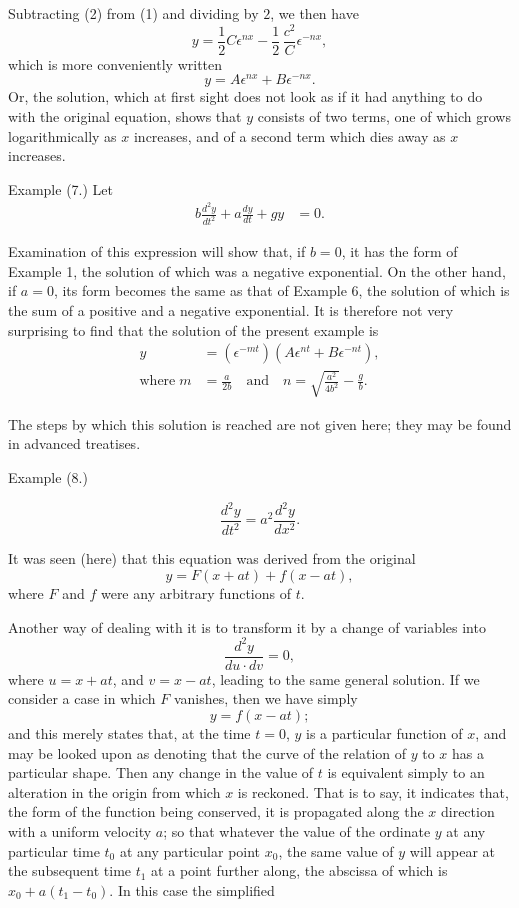 \documentclass{ximera}
\begin{document}
Subtracting (2) from (1) and dividing by $2$, we
then have
\[
y = \frac{1}{2} C \epsilon^{nx} - \frac{1}{2}\, \frac{c^2}{C} \epsilon^{-nx},
\]
which is more conveniently written
\[
y = A \epsilon^{nx} + B \epsilon^{-nx}.
\]
Or, the solution, which at first sight does not look
as if it had anything to do with the original equation,
shows that $y$ consists of two terms, one of which
grows logarithmically as $x$ increases, and of a second
term which dies away as $x$ increases.


Example (7.)
   Let
\begin{align*}
b \frac{d^2y}{dt^2} + a \frac{dy}{dt} + gy &= 0.
\end{align*}

Examination of this expression will show that, if
$b = 0$, it has the form of Example 1, the solution of
which was a negative exponential. On the other
hand, if $a = 0$, its form becomes the same as that of
Example 6, the solution of which is the sum of a
positive and a negative exponential. It is therefore
not very surprising to find that the solution of the
present example is
\begin{align*}
y &= (\epsilon^{-mt})(A \epsilon^{nt} + B \epsilon^{-nt}), \\
 \text{where}\;
m &= \frac{a}{2b}\quad \text{and}\quad
n  = \sqrt{\frac{a^2}{4b^2}} - \frac{g}{b}.
\end{align*}

The steps by which this solution is reached are not
given here; they may be found in advanced treatises.


Example (8.)

\[
\frac{d^2y}{dt^2} = a^2 \frac{d^2y}{dx^2}.
\]

It was seen (here) that this equation was derived
from the original
\[
y = F(x+at) + f(x-at),
\]
where $F$ and $f$ were any arbitrary functions of $t$.

Another way of dealing with it is to transform it
by a change of variables into
\[
\frac{d^2y}{du · dv} = 0,
\]
where $u = x + at$, and $v = x - at$, leading to the same
general solution. If we consider a case in which
$F$ vanishes, then we have simply
\[
y = f(x-at);
\]
and this merely states that, at the time $t = 0$, $y$ is a
particular function of $x$, and may be looked upon as
denoting that the curve of the relation of $y$ to $x$ has
a particular shape. Then any change in the value
of $t$ is equivalent simply to an alteration in the origin
from which $x$ is reckoned. That is to say, it indicates
that, the form of the function being conserved, it is
propagated along the $x$ direction with a uniform
velocity $a$; so that whatever the value of the
ordinate $y$ at any particular time $t_0$ at any particular
point $x_0$, the same value of $y$ will appear at the subsequent
time $t_1$ at a point further along, the abscissa
of which is $x_0 + a(t_1 - t_0)$. In this case the simplified
\end{document}
